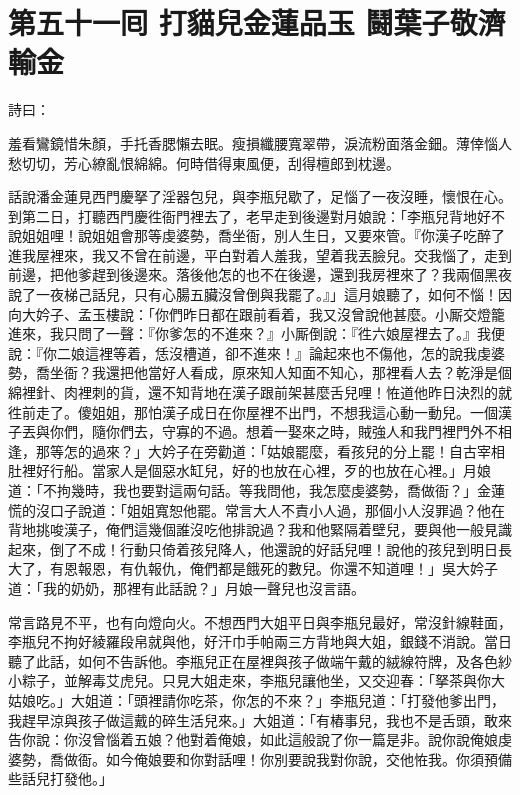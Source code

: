 
\chapter*{第五十一囘 打貓兒金蓮品玉 鬪葉子敬濟輸金}


詩曰：

羞看鸞鏡惜朱顏，手托香腮懶去眠。瘦損纖腰寬翠帶，淚流粉面落金鈿。薄倖惱人愁切切，芳心繚亂恨綿綿。何時借得東風便，刮得檀郎到枕邊。

話說潘金蓮見西門慶拏了淫器包兒，與李瓶兒歇了，足惱了一夜沒睡，{}懷恨在心。到第二日，打聽西門慶徃衙門裡去了，老早走到後邊對月娘說：「李瓶兒背地好不說姐姐哩！說姐姐會那等虔婆勢，喬坐衙，別人生日，又要來管。『你漢子吃醉了進我屋裡來，我又不曾在前邊，平白對着人羞我，望着我丟臉兒。交我惱了，走到前邊，把他爹趕到後邊來。落後他怎的也不在後邊，還到我房裡來了？我兩個黑夜說了一夜梯己話兒，只有心腸五臟沒曾倒與我罷了。』」{}這月娘聽了，如何不惱！因向大妗子、孟玉樓說：「你們昨日都在跟前看着，我又沒曾說他甚麼。小厮交燈籠進來，我只問了一聲：『你爹怎的不進來？』小厮倒說：『徃六娘屋裡去了。』我便說：『你二娘這裡等着，恁沒槽道，卻不進來！』論起來也不傷他，怎的說我虔婆勢，喬坐衙？我還把他當好人看成，原來知人知面不知心，那裡看人去？乾淨是個綿裡針、肉裡刺的貨，還不知背地在漢子跟前架甚麼舌兒哩！{}恠道他昨日決烈的就徃前走了。傻姐姐，那怕漢子成日在你屋裡不出門，不想我這心動一動兒。{}一個漢子丟與你們，隨你們去，守寡的不過。想着一娶來之時，賊強人和我門裡門外不相逢，那等怎的過來？」{}大妗子在旁勸道：「姑娘罷麼，看孩兒的分上罷！自古宰相肚裡好行船。當家人是個惡水缸兒，好的也放在心裡，歹的也放在心裡。」月娘道：「不拘幾時，我也要對這兩句話。等我問他，我怎麼虔婆勢，喬做衙？」金蓮慌的沒口子說道：「姐姐寬恕他罷。常言大人不責小人過，那個小人沒罪過？{}他在背地挑唆漢子，俺們這幾個誰沒吃他排說過？我和他緊隔着壁兒，要與他一般見識起來，倒了不成！行動只倚着孩兒降人，他還說的好話兒哩！說他的孩兒到明日長大了，有恩報恩，有仇報仇，俺們都是餓死的數兒。你還不知道哩！」吳大妗子道：「我的奶奶，那裡有此話說？」{}月娘一聲兒也沒言語。

常言路見不平，也有向燈向火。不想西門大姐平日與李瓶兒最好，常沒針線鞋面，李瓶兒不拘好綾羅段帛就與他，好汗巾手帕兩三方背地與大姐，銀錢不消說。當日聽了此話，如何不告訴他。李瓶兒正在屋裡與孩子做端午戴的絨線符牌，及各色紗小粽子，並解毒艾虎兒。{}只見大姐走來，李瓶兒讓他坐，又交迎春：「拏茶與你大姑娘吃。」大姐道：「頭裡請你吃茶，你怎的不來？」李瓶兒道：「打發他爹出門，我趕早涼與孩子做這戴的碎生活兒來。」大姐道：「有樁事兒，我也不是舌頭，敢來告你說：你沒曾惱着五娘？他對着俺娘，如此這般說了你一篇是非。說你說俺娘虔婆勢，喬做衙。如今俺娘要和你對話哩！你別要說我對你說，交他恠我。你須預備些話兒打發他。」

